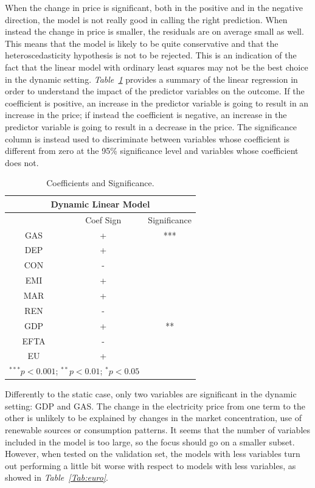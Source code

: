 \documentclass[a4paper,12pt]{book}
\begin{document}
When the change in price is significant, both in the positive and in the negative direction, the model is not really good in calling the right prediction. When instead the change in price is smaller, the residuals are on average small as well. This means that the model is likely to be quite conservative and that the heteroscedasticity hypothesis is not to be rejected. This is an indication of the fact that the linear model with ordinary least squares may not be the best choice in the dynamic setting. \textit{Table~\ref{Tab:dlm}} provides a summary of the linear regression in order to understand the impact of the predictor variables on the outcome. If the coefficient is positive, an increase in the predictor variable is going to result in an increase in the price; if instead the coefficient is negative, an increase in the predictor variable is going to result in a decrease in the price. The significance column is instead used to discriminate between variables whose coefficient is different from zero at the 95\% significance level and variables whose coefficient does not.

\begin{table}[tb]
\begin{center}
\begin{tabular}{|c|c|c|}
\hline
\multicolumn{3}{|c|}{Dynamic Linear Model}\\
\hline
&Coef Sign&Significance\\
\hline
GAS&+&***\\
DEP&+&\\
CON&-&\\
EMI&+&\\
MAR&+&\\
REN&-&\\
GDP&+&**\\
EFTA&-&\\
EU&+&\\
\hline
\multicolumn{2}{l}{\scriptsize{$^{***}p<0.001$; $^{**}p<0.01$; $^{*}p<0.05$}}
\end{tabular}
\caption{Coefficients and Significance.}
\label{Tab:dlm}
\end{center}
\end{table}

Differently to the static case, only two variables are significant in the dynamic setting: GDP and GAS. The change in the electricity price from one term to the other is unlikely to be explained by changes in the market concentration, use of renewable sources or consumption patterns. It seems that the number of variables included in the model is too large, so the focus should go on a smaller subset. However, when tested on the validation set, the models with less variables turn out performing a little bit worse with respect to models with less variables, as showed in \textit{Table~\ref{Tab:euro}}.
\end{document}
